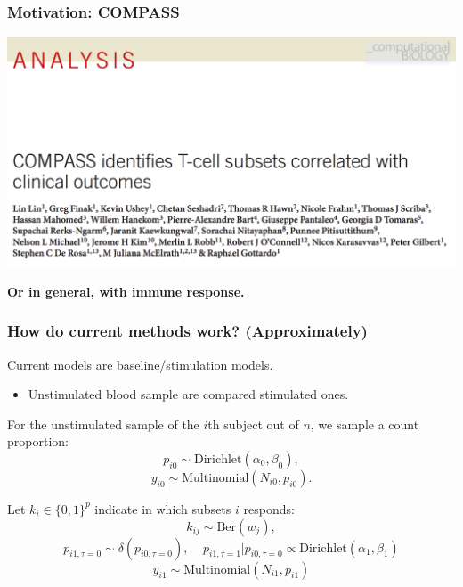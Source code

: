 \documentclass{beamer}
\theoremstyle{definition}
\begin{document}

\begin{frame}
\frametitle{Motivation: COMPASS}
\begin{center}
\includegraphics[scale=0.18]{figures/compassCaption}
\end{center}

\pause
\textbf{Or in general, with immune response.}
\end{frame}


\begin{frame}
\frametitle{How do current methods work? (Approximately)}
Current models are baseline/stimulation models. 
\begin{itemize}
\item  Unstimulated blood sample are compared stimulated ones.
\end{itemize}
\vspace{0.3 cm}

\pause
For the unstimulated sample of the $i$th subject out of $n$, we sample a count proportion:
$$
p_{i0} \sim \text{Dirichlet}(\alpha_{0},\beta_{0}),
$$$$
y_{i0} \sim \text{Multinomial}(N_{i0}, p_{i0}).
$$


\vspace{0.3 cm}
\pause
Let $k_i \in \{0,1\}^{p}$ indicate in which subsets $i$ responds:
$$
k_{ij} \sim \text{Ber}(w_j),
$$$$
p_{i1,\tau = 0} \sim \delta(p_{i0,\tau = 0}), \;\;\;\;
p_{i1, \tau = 1} | p_{i0,\tau = 0}  \propto \text{Dirichlet}(\alpha_1, \beta_{1})
$$$$
y_{i1} \sim \text{Multinomial}(N_{i1}, p_{i1})
$$
\end{frame}

\end{document}
